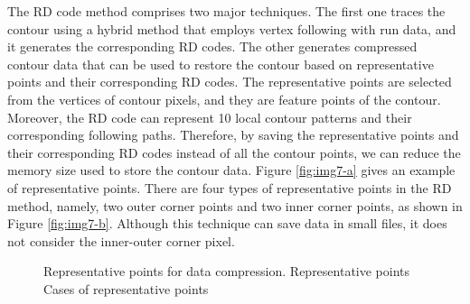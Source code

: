 The RD code method \cite{Miyatake1997Contour} comprises two major techniques. The first one traces the contour using a hybrid method that employs vertex following with run data, and it generates the corresponding RD codes. The other generates compressed contour data that can be used to restore the contour based on representative points and their corresponding RD codes. The representative points are selected from the vertices of contour pixels, and they are feature points of the contour. Moreover, the RD code can represent 10 local contour patterns and their corresponding following paths. Therefore, by saving the representative points and their corresponding RD codes instead of all the contour points, we can reduce the memory size used to store the contour data. Figure \ref{fig:img7-a} \cite{Miyatake1997Contour} gives an example of representative points. There are four types of representative points in the RD method, namely, two outer corner points and two inner corner points, as shown in Figure \ref{fig:img7-b}. Although this technique can save data in small files, it does not consider the inner-outer corner pixel. 

\begin{figure}[htbp]
	\centering
	\caption{Representative points for data compression. \protect{} Representative points \cite{Miyatake1997Contour} \protect{} Cases of representative points}
	\label{fig:rdcode}
\end{figure}
